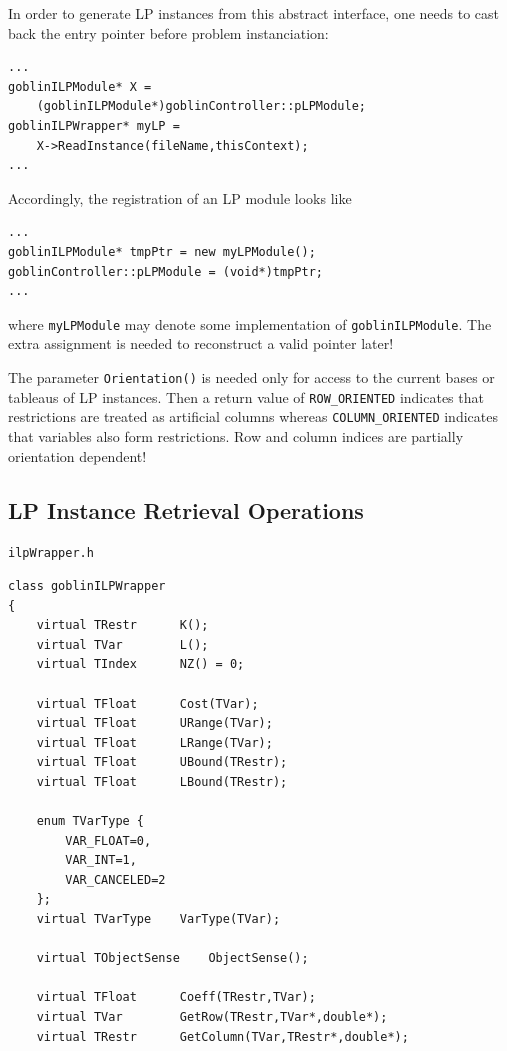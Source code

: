 \documentclass[a4paper,11pt,twoside]{book}
\begin{document}
\begin{multicols}{2}
In order to generate LP instances from this abstract interface, one needs
to cast back the entry pointer before problem instanciation:
\begin{mysample}
\begin{verbatim}
...
goblinILPModule* X =
    (goblinILPModule*)goblinController::pLPModule;
goblinILPWrapper* myLP =
    X->ReadInstance(fileName,thisContext);
...
\end{verbatim}
\end{mysample}
Accordingly, the registration of an LP module looks like
\begin{mysample}
\begin{verbatim}
...
goblinILPModule* tmpPtr = new myLPModule();
goblinController::pLPModule = (void*)tmpPtr;
...
\end{verbatim}
\end{mysample}
where \verb/myLPModule/ may denote some implementation of
\verb/goblinILPModule/. The extra assignment is needed to reconstruct
a valid pointer later!

The parameter \verb/Orientation()/ is needed only for access to the
current bases or tableaus of LP instances. Then a return value of
\verb/ROW_ORIENTED/ indicates that restrictions are treated as artificial
columns whereas \verb/COLUMN_ORIENTED/ indicates that variables also form
restrictions. Row and column indices are partially orientation dependent!


\newpage
\subsection{LP Instance Retrieval Operations}
\myinclude\verb/ilpWrapper.h/
\begin{mymethods}
\begin{verbatim}
class goblinILPWrapper
{
    virtual TRestr      K();
    virtual TVar        L();
    virtual TIndex      NZ() = 0;
    
    virtual TFloat      Cost(TVar);
    virtual TFloat      URange(TVar);
    virtual TFloat      LRange(TVar);
    virtual TFloat      UBound(TRestr);
    virtual TFloat      LBound(TRestr);
    
    enum TVarType {
        VAR_FLOAT=0,
        VAR_INT=1,
        VAR_CANCELED=2
    };
    virtual TVarType    VarType(TVar);

    virtual TObjectSense    ObjectSense();

    virtual TFloat      Coeff(TRestr,TVar);
    virtual TVar        GetRow(TRestr,TVar*,double*);
    virtual TRestr      GetColumn(TVar,TRestr*,double*);


\end{verbatim}
\end{mymethods}
\end{multicols}
\end{document}

